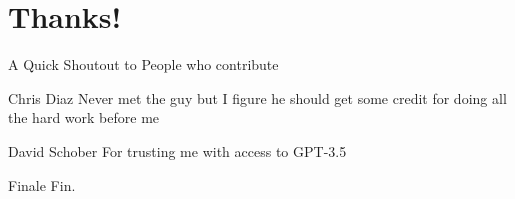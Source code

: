 \documentclass[aspectratio=169,9pt,xcolor=dvipsnames]{beamer}
\begin{document}
\section{Thanks!}
\begin{frame}{A Quick Shoutout to People who contribute}
    \begin{block}{Chris Diaz}
        Never met the guy but I figure he should get some credit for doing all the hard work before me
    \end{block}
    \begin{block}{David Schober}
        For trusting me with access to GPT-3.5
    \end{block}
\end{frame}
\begin{frame}{Finale}
    \centering
    Fin.
    
\end{frame}
\end{document}
